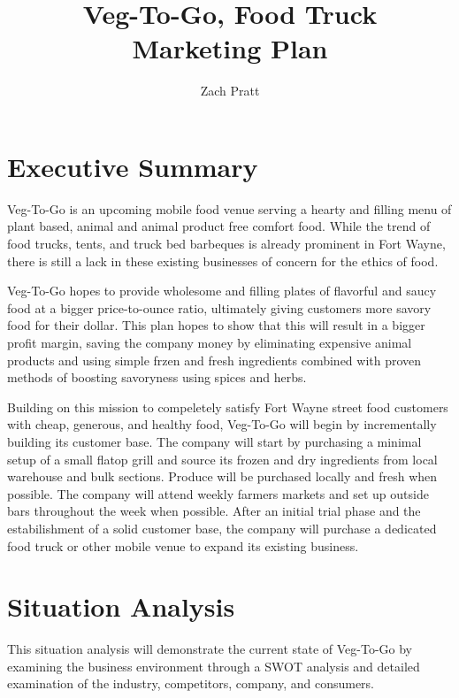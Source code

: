 \documentclass[12pt, letterpaper]{article}
\newcommand{\companyname}{Veg-To-Go}
\begin{document}
\title{\companyname{},\textsuperscript{\textregistered} Food Truck\\ Marketing Plan}
\author{Zach Pratt}
\maketitle

\newpage

\renewcommand\contentsname{Table of Contents}
\renewcommand{\cftsecleader}{\cftdotfill{\cftdotsep}}
\tableofcontents

\newpage

\section{Executive Summary}
Veg-To-Go is an upcoming mobile food venue serving a hearty and filling menu of plant based, animal and animal product free comfort food.  While the trend of food trucks, tents, and truck bed barbeques is already prominent in Fort Wayne, there is still a lack in these existing businesses of concern for the ethics of food.

Veg-To-Go hopes to provide wholesome and filling plates of flavorful and saucy food at a bigger price-to-ounce ratio, ultimately giving customers more savory food for their dollar.  This plan hopes to show that this will result in a bigger profit margin, saving the company money by eliminating expensive animal products and using simple frzen and fresh ingredients combined with proven methods of boosting savoryness using spices and herbs.

Building on this mission to compeletely satisfy Fort Wayne street food customers with cheap, generous, and healthy food, Veg-To-Go will begin by incrementally building its customer base.  The company will start by purchasing a minimal setup of a small flatop grill and source its frozen and dry ingredients from local warehouse and bulk sections. Produce will be purchased locally and fresh when possible.  The company will attend weekly farmers markets and set up outside bars throughout the week when possible.  After an initial trial phase and the estabilishment of a solid customer base, the company will purchase a dedicated food truck or other mobile venue to expand its existing business.

\section{Situation Analysis}
This situation analysis will demonstrate the current state of \companyname{} by examining the business environment through a SWOT analysis and detailed examination of the industry, competitors, company, and consumers.
\end{document}
